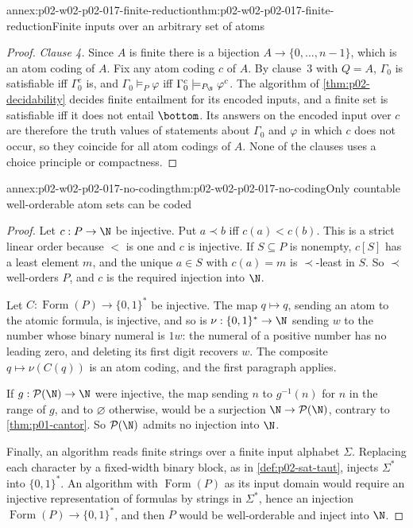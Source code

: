 \begin{annexitem}{annex:p02-w02-p02-017-finite-reduction}{thm:p02-w02-p02-017-finite-reduction}{Finite inputs over an arbitrary set of atoms}
\begin{proof}
\emph{Clause 4.}  Since \(A\) is finite there is a bijection
\(A\to\{0,\ldots,n-1\}\), which is an atom coding of \(A\).  Fix any atom
coding \(c\) of \(A\).  By clause~3 with \(Q=A\), \(\Gamma_0\) is
satisfiable iff \(\Gamma_0^{c}\) is, and \(\Gamma_0\models_P\varphi\) iff
\(\Gamma_0^{c}\models_{P_{\N}}\varphi^{c}\).  The algorithm of
\cref{thm:p02-decidability} decides finite entailment for its encoded
inputs, and a finite set is satisfiable iff it does not entail
\(\bottom\).  Its answers on the encoded input over \(c\) are therefore
the truth values of statements about \(\Gamma_0\) and \(\varphi\) in
which \(c\) does not occur, so they coincide for all atom codings of
\(A\).  None of the clauses uses a choice principle or compactness.
\end{proof}
\end{annexitem}

\begin{annexitem}{annex:p02-w02-p02-017-no-coding}{thm:p02-w02-p02-017-no-coding}{Only countable well-orderable atom sets can be coded}
\begin{proof}
Let \(c:P\to\N\) be injective.  Put \(a\prec b\) iff \(c(a)<c(b)\).  This
is a strict linear order because \(<\) is one and \(c\) is injective.  If
\(S\subseteq P\) is nonempty, \(c[S]\) has a least element \(m\), and the
unique \(a\in S\) with \(c(a)=m\) is \(\prec\)-least in \(S\).  So
\(\prec\) well-orders \(P\), and \(c\) is the required injection into
\(\N\).

Let \(C:\operatorname{Form}(P)\to\{0,1\}^{*}\) be injective.  The map
\(q\mapsto q\), sending an atom to the atomic formula, is injective, and
so is \(\nu:\{0,1\}^{*}\to\N\) sending \(w\) to the number whose binary
numeral is \(1w\): the numeral of a positive number has no leading zero,
and deleting its first digit recovers \(w\).  The composite
\(q\mapsto\nu(C(q))\) is an atom coding, and the first paragraph applies.

If \(g:\mathcal P(\N)\to\N\) were injective, the map sending \(n\) to
\(g^{-1}(n)\) for \(n\) in the range of \(g\), and to \(\varnothing\)
otherwise, would be a surjection \(\N\to\mathcal P(\N)\), contrary to
\cref{thm:p01-cantor}.  So \(\mathcal P(\N)\) admits no injection into
\(\N\).

Finally, an algorithm reads finite strings over a finite input alphabet
\(\Sigma\).  Replacing each character by a fixed-width binary block, as in
\cref{def:p02-sat-taut}, injects \(\Sigma^{*}\) into \(\{0,1\}^{*}\).  An
algorithm with \(\operatorname{Form}(P)\) as its input domain would
require an injective representation of formulas by strings in
\(\Sigma^{*}\), hence an injection
\(\operatorname{Form}(P)\to\{0,1\}^{*}\), and then \(P\) would be
well-orderable and inject into \(\N\).
\end{proof}
\end{annexitem}

